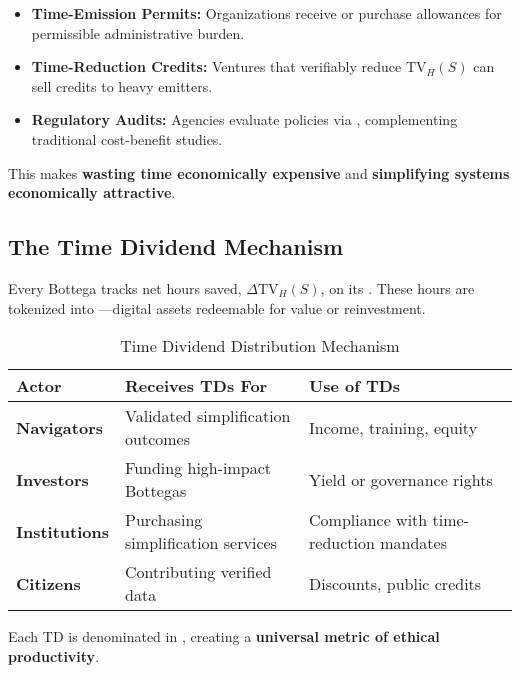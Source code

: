 \begin{itemize}
    \item \textbf{Time-Emission Permits:} Organizations receive or purchase allowances for permissible administrative burden.
    \item \textbf{Time-Reduction Credits:} Ventures that verifiably reduce $\text{TV}_H(S)$ can sell credits to heavy emitters.
    \item \textbf{Regulatory Audits:} Agencies evaluate policies via , complementing traditional cost-benefit studies.
\end{itemize}

This makes \textbf{wasting time economically expensive} and \textbf{simplifying systems economically attractive}.

\subsection{The Time Dividend Mechanism}
\label{sec:time-dividends}

Every Bottega tracks net hours saved, $\Delta \text{TV}_H(S)$, on its . These hours are tokenized into —digital assets redeemable for value or reinvestment.

\begin{table}[h]
\centering
\caption{Time Dividend Distribution Mechanism}
\label{tab:time-dividends}
\begin{tabular}{p{3cm}p{4.5cm}p{4.5cm}}
\toprule
\textbf{Actor} & \textbf{Receives TDs For} & \textbf{Use of TDs} \\
\midrule
\textbf{Navigators} & Validated simplification outcomes & Income, training, equity \\
\addlinespace
\textbf{Investors} & Funding high-impact Bottegas & Yield or governance rights \\
\addlinespace
\textbf{Institutions} & Purchasing simplification services & Compliance with time-reduction mandates \\
\addlinespace
\textbf{Citizens} & Contributing verified data & Discounts, public credits \\
\bottomrule
\end{tabular}
\end{table}

Each TD is denominated in , creating a \textbf{universal metric of ethical productivity}.


